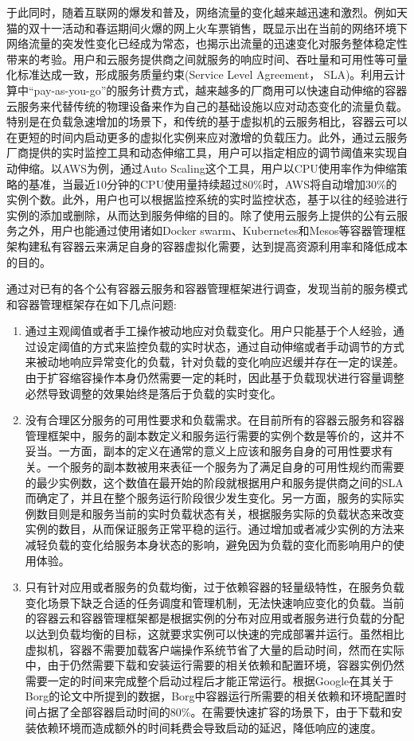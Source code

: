 于此同时，随着互联网的爆发和普及，网络流量的变化越来越迅速和激烈。例如天猫的双十一活动和春运期间火爆的网上火车票销售，既显示出在当前的网络环境下网络流量的突发性变化已经成为常态，也揭示出流量的迅速变化对服务整体稳定性带来的考验。用户和云服务提供商之间就服务的响应时间、吞吐量和可用性等可量化标准达成一致，形成服务质量约束(Service Level Agreement， SLA)\cite{patel2009service}。利用云计算中“pay-as-you-go”的服务计费方式\cite{armbrust2010view}，越来越多的厂商用可以快速自动伸缩的容器云服务来代替传统的物理设备来作为自己的基础设施以应对动态变化的流量负载。特别是在负载急速增加的场景下，和传统的基于虚拟机的云服务相比，容器云可以在更短的时间内启动更多的虚拟化实例来应对激增的负载压力。此外，通过云服务厂商提供的实时监控工具和动态伸缩工具，用户可以指定相应的调节阈值来实现自动伸缩。以AWS为例，通过Auto Scaling这个工具，用户以CPU使用率作为伸缩策略的基准，当最近10分钟的CPU使用量持续超过80\%时，AWS将自动增加30\%的实例个数。此外，用户也可以根据监控系统的实时监控状态，基于以往的经验进行实例的添加或删除，从而达到服务伸缩的目的。除了使用云服务上提供的公有云服务之外，用户也能通过使用诸如Docker swarm、Kubernetes和Mesos等容器管理框架构建私有容器云来满足自身的容器虚拟化需要，达到提高资源利用率和降低成本的目的。

通过对已有的各个公有容器云服务和容器管理框架进行调查，发现当前的服务模式和容器管理框架存在如下几点问题:
\begin{enumerate}
\item 通过主观阈值或者手工操作被动地应对负载变化。用户只能基于个人经验，通过设定阈值的方式来监控负载的实时状态，通过自动伸缩或者手动调节的方式来被动地响应异常变化的负载，针对负载的变化响应迟缓并存在一定的误差。由于扩容缩容操作本身仍然需要一定的耗时，因此基于负载现状进行容量调整必然导致调整的效果始终是落后于负载的实时变化。
\item 没有合理区分服务的可用性要求和负载需求。在目前所有的容器云服务和容器管理框架中，服务的副本数定义和服务运行需要的实例个数是等价的，这并不妥当。一方面，副本的定义在通常的意义上应该和服务自身的可用性要求有关。一个服务的副本数被用来表征一个服务为了满足自身的可用性规约而需要的最少实例数，这个数值在最开始的阶段就根据用户和服务提供商之间的SLA而确定了，并且在整个服务运行阶段很少发生变化\cite{beyer2016site}。另一方面，服务的实际实例数目则是和服务当前的实时负载状态有关，根据服务实际的负载状态来改变实例的数目，从而保证服务正常平稳的运行。通过增加或者减少实例的方法来减轻负载的变化给服务本身状态的影响，避免因为负载的变化而影响用户的使用体验。
\item 只有针对应用或者服务的负载均衡，过于依赖容器的轻量级特性，在服务负载变化场景下缺乏合适的任务调度和管理机制，无法快速响应变化的负载。当前的容器云和容器管理框架都是根据实例的分布对应用或者服务进行负载的分配以达到负载均衡的目标，这就要求实例可以快速的完成部署并运行。虽然相比虚拟机，容器不需要加载客户端操作系统节省了大量的启动时间，然而在实际中，由于仍然需要下载和安装运行需要的相关依赖和配置环境，容器实例仍然需要一定的时间来完成整个启动过程后才能正常运行。根据Google在其关于Borg的论文中所提到的数据，Borg中容器运行所需要的相关依赖和环境配置时间占据了全部容器启动时间的80\%\cite{verma2015large}。在需要快速扩容的场景下，由于下载和安装依赖环境而造成额外的时间耗费会导致启动的延迟，降低响应的速度。
\end{enumerate}

